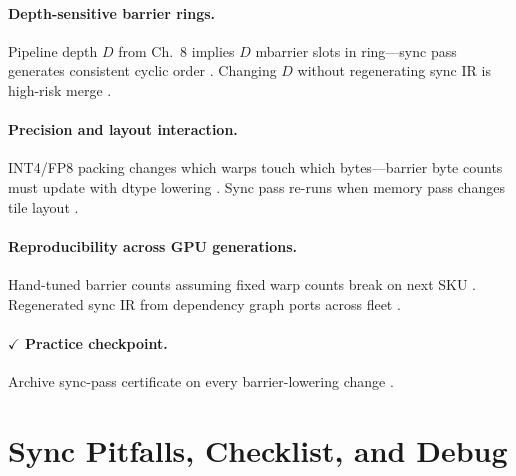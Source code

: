 \paragraph{Depth-sensitive barrier rings.}
Pipeline depth $D$ from Ch.~8 implies $D$ mbarrier slots in ring---sync pass generates consistent cyclic order \citep{semianalysis2024tma,dao2022flashattention,shah2024flashattention3}.
Changing $D$ without regenerating sync IR is high-risk merge \citep{yirage2026,taxbreak2026,memoryfloor2026}.

\paragraph{Precision and layout interaction.}
INT4/FP8 packing changes which warps touch which bytes---barrier byte counts must update with dtype lowering \citep{taxbreak2026,yirage2026,shah2024flashattention3}.
Sync pass re-runs when memory pass changes tile layout \citep{wu2024mirage,chen2020compilerbasedhardw,dao2022flashattention}.

\paragraph{Reproducibility across GPU generations.}
Hand-tuned barrier counts assuming fixed warp counts break on next SKU \citep{nvidia2022hopper,patel2025llminference,taxbreak2026}.
Regenerated sync IR from dependency graph ports across fleet \citep{yirage2026,chen2020compilerbasedhardw,mpk2025}.

\paragraph{$\checkmark$ Practice checkpoint.}
Archive sync-pass certificate on every barrier-lowering change \citep{chen2020compilerbasedhardw,yirage2026}.

\section{Sync Pitfalls, Checklist, and Debug}
\label{sec:ch09_sync_pitfalls}

